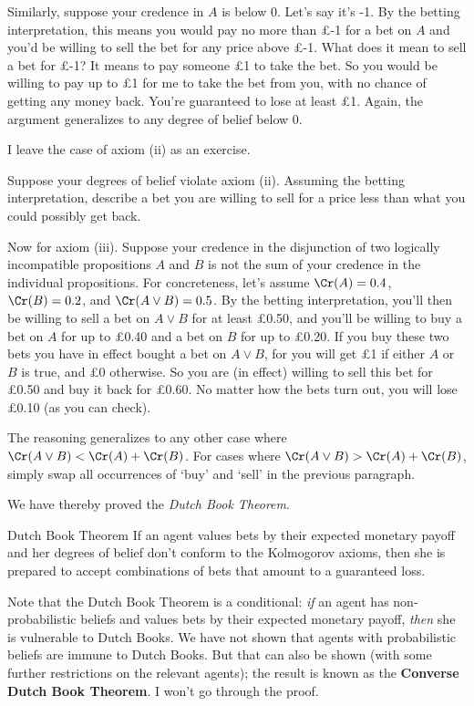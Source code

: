 Similarly, suppose your credence in $A$ is below 0. Let's say it's
-1. By the betting interpretation, this means you would pay no more
than £-1 for a bet on $A$ and you'd be willing to sell the bet for any
price above £-1. What does it mean to sell a bet for £-1?  It means to
pay someone £1 to take the bet. So you would be willing to pay up to
£1 for me to take the bet from you, with no chance of getting any
money back. You're guaranteed to lose at least £1. Again, the argument
generalizes to any degree of belief below 0.

I leave the case of axiom (ii) as an exercise.

\begin{exercise}{2}
  Suppose your degrees of belief violate axiom (ii). Assuming the
  betting interpretation, describe a bet you are willing to sell for a
  price less than what you could possibly get back.
\end{exercise}

Now for axiom (iii). Suppose your credence in the disjunction of two
logically incompatible propositions $A$ and $B$ is not the sum of your
credence in the individual propositions. For concreteness, let's
assume $\Cr(A) = 0.4$, $\Cr(B) = 0.2$, and $\Cr(A \lor B) = 0.5$. By
the betting interpretation, you'll then be willing to sell a bet on $A
\lor B$ for at least £0.50, and you'll be willing to buy a bet on $A$
for up to £0.40 and a bet on $B$ for up to £0.20. If you
buy these two bets you have in effect bought a bet on $A \lor B$, for
you will get £1 if either $A$ or $B$ is true, and £0 otherwise. So you
are (in effect) willing to sell this bet for £0.50 and buy it back for
£0.60. No matter how the bets turn out, you will lose £0.10
(as you can check).

The reasoning generalizes to any other case where
$\Cr(A \lor B) < \Cr(A) + \Cr(B)$. For cases where
$\Cr(A \lor B) > \Cr(A) + \Cr(B)$, simply swap all occurrences of
`buy' and `sell' in the previous paragraph.

We have thereby proved the \emph{Dutch Book Theorem}.

\begin{genericthm}{Dutch Book Theorem}
  If an agent values bets by their expected monetary payoff and her
  degrees of belief don't conform to the Kolmogorov axioms, then she
  is prepared to accept combinations of bets that amount to a
  guaranteed loss. 
\end{genericthm}

Note that the Dutch Book Theorem is a conditional: \emph{if} an agent
has non-probabilistic beliefs and values bets by their expected
monetary payoff, \emph{then} she is vulnerable to Dutch Books. We have
not shown that agents with probabilistic beliefs are immune to Dutch
Books. But that can also be shown (with some further
restrictions on the relevant agents); the result is known as the
\textbf{Converse Dutch Book Theorem}. I won't go through the proof.

